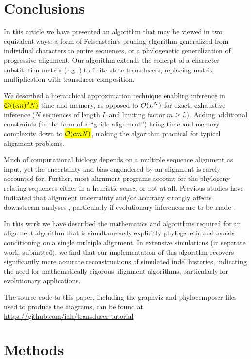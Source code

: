 \documentclass{article}
\begin{document}
\section{Conclusions}

In this article we have presented an algorithm that may be viewed in two equivalent ways: a form of Felsenstein's pruning algorithm generalized from individual characters to entire sequences, 
or a phylogenetic generalization of progressive alignment.   
Our algorithm  extends the concept of a character substitution matrix (e.g. \cite{JukesCantor69, HasegawaEtAl85}) to finite-state transducers, replacing matrix multiplication with transducer composition.

We described a hierarchical  approximation technique enabling inference in \hl{ ${\cal O}((cm)^2N)$} time and memory, as opposed to ${\cal O}(L^N)$ for exact, exhaustive inference ($N$ sequences of length $L$ and limiting factor $m\geq L$). 
Adding additional constraints (in the form of a ``guide alignment'')  bring time and memory complexity down to \hl{ ${\cal O}(cmN)$}, making the algorithm practical for typical alignment problems.  

Much of computational biology depends on a multiple sequence alignment as input, yet the uncertainty and bias engendered by an alignment is rarely accounted for.  
Further, most alignment programs account for the phylogeny relating sequences either in a heuristic sense, or not at all.  
Previous studies have indicated that alignment uncertainty and/or accuracy  strongly affects downstream analyses \cite{WongEtAl2008}, particularly if evolutionary inferences are to be made \cite{LoytynojaGoldman2008}.

In this work we have described  the mathematics and algorithms required for an alignment algorithm that is simultaneously explicitly phylogenetic and avoids conditioning on a single multiple alignment.
  In extensive simulations (in separate work, submitted), we find that our implementation of this algorithm recovers significantly more accurate reconstructions of simulated indel histories, 
indicating the need for mathematically rigorous alignment algorithms, particularly for evolutionary applications. 

The source code to this paper, including the graphviz and phylocomposer files used to produce the diagrams,
can be found at \url{https://github.com/ihh/transducer-tutorial}

\section{Methods}
\end{document}
